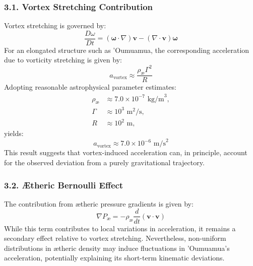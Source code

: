     \subsubsection*{3.1. Vortex Stretching Contribution}
    Vortex stretching is governed by:
    \begin{equation*}
        \frac{D\omega}{Dt} = (\mathbf{\omega} \cdot \nabla) \mathbf{v} - (\nabla \cdot \mathbf{v}) \mathbf{\omega}
    \end{equation*}
    For an elongated structure such as 'Oumuamua, the corresponding acceleration due to vorticity stretching is given by:
    \begin{equation*}
        a_\text{vortex} \approx \frac{\rho_\text{\ae} \Gamma^2}{R}
    \end{equation*}
    Adopting reasonable astrophysical parameter estimates:
    \begin{align*}
        \rho_\text{\ae} &\approx 7.0 \times 10^{-7} \text{ kg/m}^3,\\
        \Gamma &\approx 10^3 \text{ m}^2/\text{s},\\
        R &\approx 10^2 \text{ m},
    \end{align*}
    yields:
    \begin{equation*}
        a_\text{vortex} \approx 7.0 \times 10^{-6} \text{ m/s}^2
    \end{equation*}
    This result suggests that vortex-induced acceleration can, in principle, account for the observed deviation from a purely gravitational trajectory.

    \subsubsection*{3.2. Ætheric Bernoulli Effect}
    The contribution from ætheric pressure gradients is given by:
    \begin{equation*}
        \nabla P_\text{\ae} = -\rho_\text{\ae} \frac{d}{dt} (\mathbf{v} \cdot \mathbf{v})
    \end{equation*}
    While this term contributes to local variations in acceleration, it remains a secondary effect relative to vortex stretching. Nevertheless, non-uniform distributions in ætheric density may induce fluctuations in 'Oumuamua's acceleration, potentially explaining its short-term kinematic deviations.

